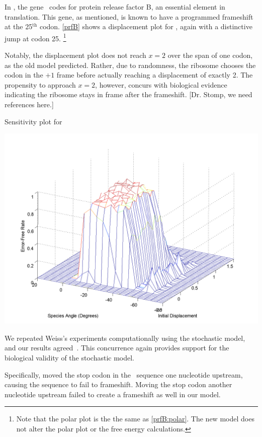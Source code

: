 \documentclass[12pt]{article}
\numberwithin{equation}{section}
\begin{document}
In \ecoli, the gene \prfB\ codes for protein release factor B, an
essential element in translation.  This gene, as mentioned, is known
to have a programmed frameshift at the 25$^{\textrm{th}}$ codon.
\autoref{prfB} shows a displacement plot for
\prfB, again with a distinctive jump at codon 25.
\footnote{Note that the polar plot is the the same as \autoref{prfB:polar}. 
The new model does not alter the polar plot or the free energy calculations.}

Notably, the displacement plot does not reach $x=2$ over the span of
one codon, as the old model predicted.  Rather, due to randomness, the
ribosome chooses the codon in the $+1$ frame before actually reaching
a displacement of exactly 2.  The propensity to approach $x=2$,
however, concurs with biological evidence indicating the ribosome
stays in frame after the frameshift.  [Dr. Stomp, we need references
  here.]

\begin{cfigure}
  \caption{Sensitivity plot for \prfB}
  \label{prfB:sens}
  \includegraphics[scale=0.4]{prfB/sensitivity}
\end{cfigure}

We repeated Weiss's experiments computationally
using the stochastic model, and our results agreed~\cite{weiss87,weiss88}.
This concurrence again provides support for the biological validity of
the stochastic model.

Specifically, \citeauthor{weiss87} moved the stop codon in the
\prfB\ sequence one nucleotide upstream, causing the sequence to fail to
frameshift. Moving the stop codon another nucleotide upstream failed
to create a frameshift as well in our model.
\end{document}
